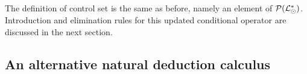The definition of control set is the same as before, namely an element of
$\mathcal{P}(\mathcal{L}_{\odot}^*)$. Introduction and elimination rules for this
updated conditional operator are discussed in the next section.

\subsection{An alternative natural deduction calculus}








